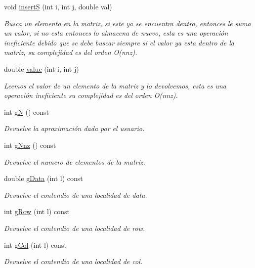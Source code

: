 \begin{DoxyCompactItemize}
void \hyperlink{class_c_o_o_a6d547f9db3f93c97fecc92a4ff4207cd}{insertS} (int i, int j, double val)
\begin{DoxyCompactList}\small\item\em Busca un elemento en la matriz, si este ya se encuentra dentro, entonces le suma un valor, si no esta entonces lo almacena de nuevo, esta es una operación ineficiente debido que se debe buscar siempre si el valor ya esta dentro de la matriz, su complejidad es del orden O(nnz). \end{DoxyCompactList}\item 
double \hyperlink{class_c_o_o_aa256b26277dfa7018db115f4fad65406}{value} (int i, int j)
\begin{DoxyCompactList}\small\item\em Leemos el valor de un elemento de la matriz y lo devolvemos, esta es una operación ineficiente su complejidad es del orden O(nnz). \end{DoxyCompactList}\item 
int \hyperlink{class_c_o_o_a58c17d489f68d78f7f9c948a01ec93de}{gN} () const
\begin{DoxyCompactList}\small\item\em Devuelve la aproximación dada por el usuario. \end{DoxyCompactList}\item 
int \hyperlink{class_c_o_o_a579bd9ac3578ef00a72df67563742025}{g\+Nnz} () const
\begin{DoxyCompactList}\small\item\em Devuelve el numero de elementos de la matriz. \end{DoxyCompactList}\item 
double \hyperlink{class_c_o_o_af6e823999338171d1da2e434a89ef5d0}{g\+Data} (int l) const
\begin{DoxyCompactList}\small\item\em Devuelve el contendio de una localidad de data. \end{DoxyCompactList}\item 
int \hyperlink{class_c_o_o_a6ad2d0b5f295069c1dc0c31662afe336}{g\+Row} (int l) const
\begin{DoxyCompactList}\small\item\em Devuelve el contendio de una localidad de row. \end{DoxyCompactList}\item 
int \hyperlink{class_c_o_o_ab6f8719b7f6ef51b9785bea5969b6ed9}{g\+Col} (int l) const
\begin{DoxyCompactList}\small\item\em Devuelve el contendio de una localidad de col. \end{DoxyCompactList}\item 

\end{DoxyCompactItemize}
